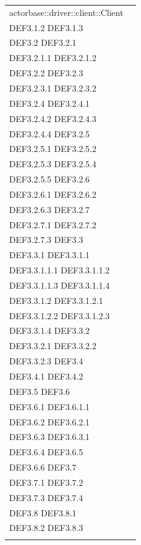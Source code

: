 \documentclass{scalatekids-article}
\begin{document}
\begin{longtable}[H]{|p{12cm}|p{5.5cm}|}
actorbase::driver::client::Client & \multiLineCell[t]{DEF3.1 DEF3.1.1\\DEF3.1.2 DEF3.1.3\\DEF3.2 DEF3.2.1\\DEF3.2.1.1 DEF3.2.1.2\\DEF3.2.2 DEF3.2.3\\DEF3.2.3.1 DEF3.2.3.2\\DEF3.2.4 DEF3.2.4.1\\DEF3.2.4.2 DEF3.2.4.3\\DEF3.2.4.4 DEF3.2.5\\DEF3.2.5.1 DEF3.2.5.2\\DEF3.2.5.3 DEF3.2.5.4\\DEF3.2.5.5 DEF3.2.6\\DEF3.2.6.1 DEF3.2.6.2\\DEF3.2.6.3 DEF3.2.7\\DEF3.2.7.1 DEF3.2.7.2\\DEF3.2.7.3 DEF3.3\\DEF3.3.1 DEF3.3.1.1\\DEF3.3.1.1.1 DEF3.3.1.1.2\\DEF3.3.1.1.3 DEF3.3.1.1.4\\DEF3.3.1.2 DEF3.3.1.2.1\\DEF3.3.1.2.2 DEF3.3.1.2.3\\DEF3.3.1.4 DEF3.3.2\\DEF3.3.2.1 DEF3.3.2.2\\DEF3.3.2.3 DEF3.4\\DEF3.4.1 DEF3.4.2\\DEF3.5 DEF3.6\\DEF3.6.1 DEF3.6.1.1\\DEF3.6.2 DEF3.6.2.1\\DEF3.6.3 DEF3.6.3.1\\DEF3.6.4 DEF3.6.5\\DEF3.6.6 DEF3.7\\DEF3.7.1 DEF3.7.2\\DEF3.7.3 DEF3.7.4\\DEF3.8 DEF3.8.1\\DEF3.8.2 DEF3.8.3\\}\\
\hline

\end{longtable}
\end{document}
